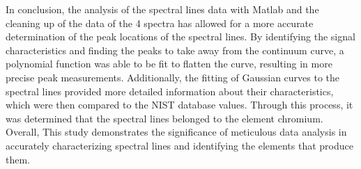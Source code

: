 In conclusion, the analysis of the spectral lines data with Matlab and the cleaning up of the data of the 4 spectra has allowed for a more accurate determination of the peak locations of the spectral lines. By identifying the signal characteristics and finding the peaks to take away from the continuum curve, a polynomial function was able to be fit to flatten the curve, resulting in more precise peak measurements. Additionally, the fitting of Gaussian curves to the spectral lines provided more detailed information about their characteristics, which were then compared to the NIST database values. Through this process, it was determined that the spectral lines belonged to the element chromium. Overall, This study demonstrates the significance of meticulous data analysis in accurately characterizing spectral lines and identifying the elements that produce them.
